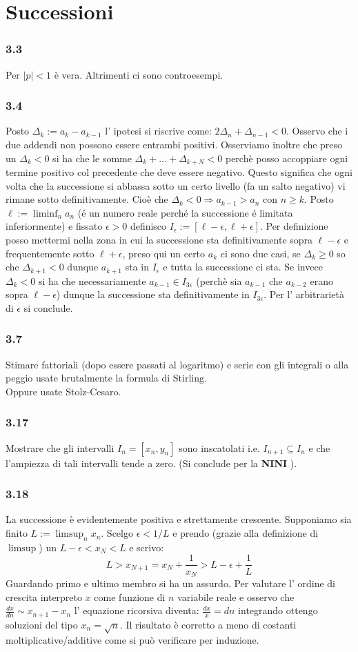 \documentclass[a4paper,11pt]{article}
\newcommand{\ex}[1]{\subsubsection*{#1}}
\newcommand{\equip}{\sim}
\newcommand{\norm}[1]{\mid{#1}\mid}
\newcommand{\NINI}{{\bf NINI }}
\newcommand{\hide}[1]{{\color{white}{#1}}}
\begin{document}
\section{Successioni}
\ex{3.3} Per $\norm{p} < 1$ \`e vera. Altrimenti ci sono controesempi. \hide{logaritmi o cose così}
\ex{3.4} Posto $\Delta_k:=a_k -a_{k-1}$ l' ipotesi si riscrive come: $ 2\Delta_n+\Delta_{n-1}<0$. Osservo che i due addendi non possono essere entrambi positivi. Osserviamo inoltre che preso un $\Delta_k<0$ si ha che le somme $\Delta_k+\ldots+\Delta_{k+N}<0$ perchè posso accoppiare ogni termine positivo col precedente che deve essere negativo. Questo significa che ogni volta che la successione si abbassa sotto un certo livello (fa un salto negativo) vi rimane sotto definitivamente. Cioè che $\Delta_k<0 \Rightarrow a_{k-1}>a_n$ con $n\ge k$. Posto $\ell:=\liminf_{n} a_n$ (\'e un numero reale perch\'e la successione \'e limitata inferiormente) e fissato $\epsilon>0$ definisco $I_{\epsilon}:=[\ell-\epsilon, \ell +\epsilon]$. Per definizione posso mettermi nella zona in cui la successione sta definitivamente sopra $\ell-\epsilon$ e frequentemente sotto $\ell +\epsilon$, preso qui un certo $a_k$ ci sono due casi, se $\Delta_k\ge0$ so che $\Delta_{k+1}<0$ dunque $a_{k+1}$ sta in $I_{\epsilon}$ e tutta la successione ci sta. Se invece $\Delta_{k}<0$ si ha che necessariamente $a_{k-1}\in I_{3\epsilon}$ (perchè sia $a_{k-1}$ che $a_{k-2}$ erano sopra $\ell-\epsilon$) dunque la successione sta definitivamente in $I_{3\epsilon}$. Per l' arbitrarietà di $\epsilon$ si conclude.
\ex{3.7} Stimare fattoriali (dopo essere passati al logaritmo) e serie con gli integrali o alla peggio usate brutalmente la formula di Stirling. \\ Oppure \hide{, se siete persone malvagie,} usate Stolz-Cesaro.
\ex{3.17} Mostrare che gli intervalli $I_n = [x_n, y_n]$ sono inscatolati i.e. $I_{n+1} \subseteq I_{n}$ e che l'ampiezza di tali intervalli tende a zero. (Si conclude per la \NINI).
\ex{3.18} La successione è evidentemente positiva e strettamente crescente. Supponiamo sia finito $L:=\limsup_n x_n$. Scelgo $\epsilon<1/L$ e prendo (grazie alla definizione di $\limsup$) un $L-\epsilon<x_N<L$ e scrivo:
$$ L>x_{N+1}=x_N+\frac{1}{x_N}>L-\epsilon+\frac{1}{L}$$
Guardando primo e ultimo membro si ha un assurdo. Per valutare l' ordine di crescita interpreto $x$ come funzione di $n$ variabile reale e osservo che $\frac{dx}{dn}\equip x_{n+1}-x_n$ l' equazione ricorsiva diventa: $\frac{dx}{x}=dn$ integrando ottengo soluzioni del tipo $x_n=\sqrt{n}$. Il risultato è corretto a meno di costanti moltiplicative/additive come si può verificare per induzione.
\end{document}

